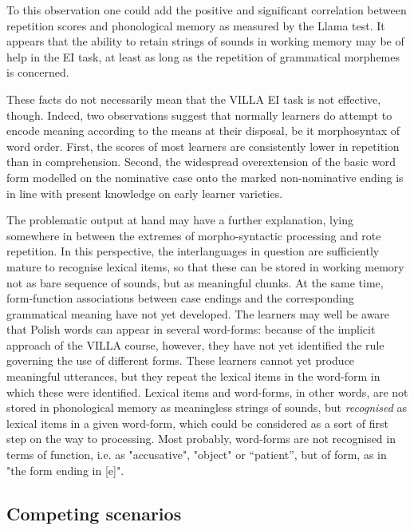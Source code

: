 To this observation one could add the positive and significant correlation between repetition scores and phonological memory as measured by the Llama test. It appears that the ability to retain strings of sounds in working memory may be of help in the EI task, at least as long as the repetition of grammatical morphemes is concerned.

These facts do not necessarily mean that the VILLA EI task is not effective, though. Indeed, two observations suggest that normally learners do attempt to encode meaning according to the means at their disposal, be it morphosyntax of word order. First, the scores of most learners are consistently lower in repetition than in comprehension. Second, the widespread overextension of the basic word form modelled on the nominative case onto the marked non-nominative ending is in line with present knowledge on early learner varieties. 

The problematic output at hand may have a further explanation, lying somewhere in between the extremes of morpho-syntactic processing and rote repetition. In this perspective, the interlanguages in question are sufficiently mature to recognise lexical items, so that these can be stored in working memory not as bare sequence of sounds, but as meaningful chunks. At the same time, form-function associations between case endings and the corresponding grammatical meaning have not yet developed. The learners may well be aware that Polish words can appear in several word-forms: because of the implicit approach of the VILLA course, however, they have not yet identified the rule governing the use of different forms. These learners cannot yet produce meaningful utterances, but they repeat the lexical items in the word-form in which these were identified. Lexical items and word-forms, in other words, are not stored in phonological memory as meaningless strings of sounds, but \textit{recognised} as lexical items in a given word-form, which could be considered as a sort of first step on the way to processing. Most probably, word-forms are not recognised in terms of function, i.e. as "accusative", "object" or “patient”, but of form, as in "the form ending in [e]". 

\subsection{Competing scenarios}\label{sec:08:4.3}

